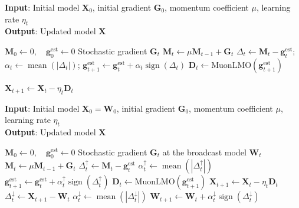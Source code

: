 \documentclass[letterpaper]{article} %
\begin{document}
\begin{algorithm}[!t]
\caption{EF21-MuonUSign}
\label{central_alg_ef}
\textbf{Input}: Initial model $\mathbf{X}_0$, initial gradient $\mathbf{G}_0$, momentum coefficient $\mu$, learning rate $\eta_t$ \\
\textbf{Output}: Updated model $\mathbf{X}$
\begin{algorithmic}[1]
\State $\mathbf{M}_0 \gets 0,\quad \mathbf{g}_0^{\mathrm{est}} \gets 0$
  \State Stochastic gradient $\mathbf{G}_t$
  \State $\mathbf{M}_t \gets \mu\mathbf{M}_{t-1} + \mathbf{G}_t$
  \State $\Delta_t \gets \mathbf{M}_t - \mathbf{g}_t^{\mathrm{est}}$;
  \quad $\alpha_t \gets \operatorname{mean}(|\Delta_t|)$;
  \State $\mathbf{g}_{t+1}^{\mathrm{est}} \gets \mathbf{g}_t^{\mathrm{est}} + \alpha_t\operatorname{sign}(\Delta_t)$ 
  \State $\mathbf{D}_t \gets \mathrm{MuonLMO}(\mathbf{g}_{t+1}^{\mathrm{est}})$
        
  \State $\mathbf{X}_{t+1} \gets \mathbf{X}_t - \eta_t\mathbf{D}_t$
\EndFor
\end{algorithmic}
\end{algorithm}

\begin{algorithm}[!t]
\caption{EF21-MuonUDSign }
\label{central_alg_ud}
\textbf{Input}: Initial model $\mathbf{X}_0=\mathbf{W}_0$,  initial gradient $\mathbf{G}_0$, momentum coefficient $\mu$, learning rate $\eta_t$ \\
\textbf{Output}: Updated model $\mathbf{X}$
\begin{algorithmic}[1]
\State $\mathbf{M}_0 \gets 0,\quad \mathbf{g}_0^{\mathrm{est}} \gets 0$
\State Stochastic gradient $\mathbf{G}_t$ at the broadcast model $\mathbf{W}_t$
\State $\mathbf{M}_t \gets \mu\mathbf{M}_{t-1} + \mathbf{G}_t$ 
\State $\Delta_t^{\uparrow} \gets \mathbf{M}_t - \mathbf{g}_t^{\mathrm{est}}$
\State $\alpha_t^{\uparrow} \gets
\operatorname{mean}(|\Delta_t^{\uparrow}|)$
\State $\mathbf{g}_{t+1}^{\mathrm{est}} \gets \mathbf{g}_t^{\mathrm{est}} +
\alpha_t^{\uparrow}\operatorname{sign}(\Delta_t^{\uparrow})$ 
\State $\mathbf{D}_t \gets \mathrm{MuonLMO}(\mathbf{g}_{t+1}^{\mathrm{est}})$
\State $\mathbf{X}_{t+1} \gets \mathbf{X}_t - \eta_t\mathbf{D}_t$
\State $\Delta_t^{\downarrow} \gets \mathbf{X}_{t+1} - \mathbf{W}_t$
\State $\alpha_t^{\downarrow} \gets
\operatorname{mean}(|\Delta_t^{\downarrow}|)$
\State $\mathbf{W}_{t+1} \gets \mathbf{W}_t + \alpha_t^{\downarrow}\operatorname{sign}(\Delta_t^{\downarrow})$
\EndFor
\end{algorithmic}
\end{algorithm}
\end{document}

